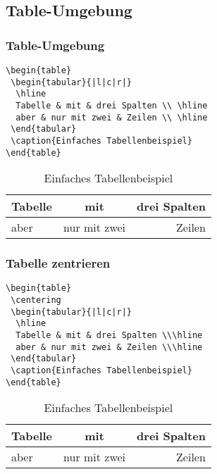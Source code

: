\subsection{Table-Umgebung}
\begin{frame}[fragile]
\frametitle{Table-Umgebung}
\begin{verbatim}  
\begin{table}
 \begin{tabular}{|l|c|r|}
  \hline
  Tabelle & mit & drei Spalten \\ \hline
  aber & nur mit zwei & Zeilen \\ \hline
 \end{tabular}
 \caption{Einfaches Tabellenbeispiel}
\end{table}
  \end{verbatim} \pause

  \begin{table}
      \begin{tabular}{|l|c|r|}
	\hline
	Tabelle & mit & drei Spalten \\\hline
	aber & nur mit zwei & Zeilen \\\hline
      \end{tabular}
      \caption{Einfaches Tabellenbeispiel}
    \end{table}
\end{frame}


\begin{frame}[fragile]
\frametitle{Tabelle zentrieren}
\begin{verbatim}  
\begin{table}
 \centering
 \begin{tabular}{|l|c|r|}
  \hline
  Tabelle & mit & drei Spalten \\\hline
  aber & nur mit zwei & Zeilen \\\hline
 \end{tabular}
 \caption{Einfaches Tabellenbeispiel}
\end{table}
\end{verbatim}
\pause
    
    \begin{table}
      \centering
      \begin{tabular}{|l|c|r|}
	\hline
	Tabelle & mit & drei Spalten \\\hline
	aber & nur mit zwei & Zeilen \\\hline
      \end{tabular}
      \caption{Einfaches Tabellenbeispiel}
    \end{table}
\end{frame}
